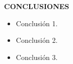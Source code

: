 \clearpage\null\vspace{2.55 cm}
\begin{center}
{\large \bfseries CONCLUSIONES}
\end{center}
\null\null

\begin{itemize}

	\item Conclusión 1.
	\item Conclusión 2.
  \item Conclusión 3.

\end{itemize}
